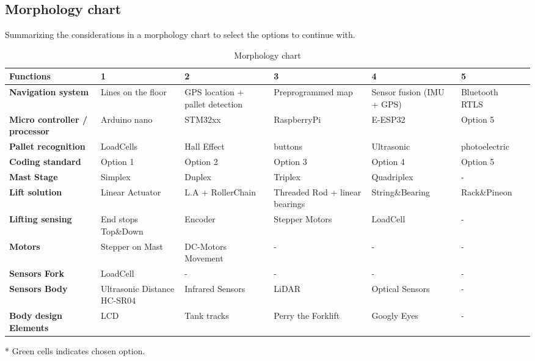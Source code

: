 \documentclass[../report.tex]{subfiles}
\begin{document}
\subsection{Morphology chart}
Summarizing the considerations in a morphology chart to select the options
to continue with.
\begin{table}[H]
    \begin{center}
        \begin{tabularx}{\linewidth}{|L|L|L|L|L|L|L}
            \hline
            \textbf{Functions} & \textbf{1} & \textbf{2}& \textbf{3} & 
            \textbf{4} & \textbf{5} \\
            \hline
            \textbf{Navigation system} & Lines on the floor & GPS location + pallet detection & Preprogrammed map  & Sensor fusion (IMU + GPS) & 
            Bluetooth RTLS \\
            \hline
            \textbf{Micro controller / processor} & Arduino nano & STM32xx & RaspberryPi& E-ESP32 & 
            Option 5 \\
            \hline
            \textbf{Pallet recognition} & LoadCells & Hall Effect & buttons & Ultrasonic & 
            photoelectric \\
            \hline
            \textbf{Coding standard} & Option 1 & Option 2 & Option 3 & Option 4 & 
            Option 5 \\
            \hline
            \textbf{Mast Stage} & Simplex & Duplex & Triplex & Quadriplex & 
            -\\
            \hline
            \textbf{Lift solution} & Linear Actuator & L.A + RollerChain & Threaded Rod + linear bearings& String\&Bearing & Rack\&Pineon \\
            \hline
            \textbf{Lifting sensing} & End stops Top\&Down & Encoder & Stepper Motors & LoadCell & 
            -\\
            \hline
            \textbf{Motors} & Stepper on Mast & DC-Motors Movement & - & - & 
            -\\
            \hline
            \textbf{Sensors Fork} & LoadCell & - & - & - & 
            -\\
            \hline
            \textbf{Sensors Body} & Ultrasonic Distance HC-SR04 & Infrared Sensors & LiDAR & Optical Sensors & 
            -\\
            \hline
            \textbf{Body design Elements} & LCD & Tank tracks &Perry the Forklift & Googly Eyes & 
            - \\
            \hline
        \end{tabularx}
    \end{center}
    \caption{Morphology chart}
\end{table}
* Green cells indicates chosen option.
\end{document}
